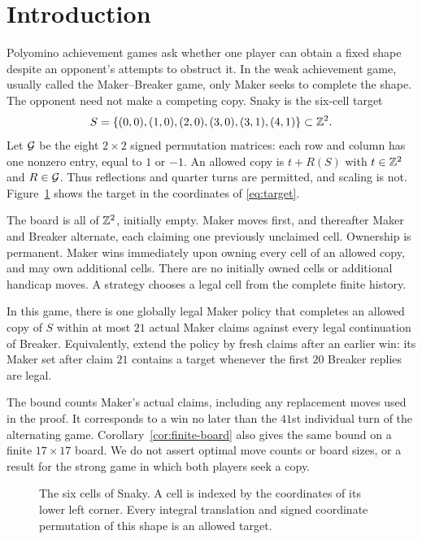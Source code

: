 \section{Introduction}\label{sec:introduction}

Polyomino achievement games ask whether one player can obtain a fixed
shape despite an opponent's attempts to obstruct it. In the weak
achievement game, usually called the Maker--Breaker game, only Maker
seeks to complete the shape. The opponent need not make a competing
copy. Snaky is the six-cell target
\begin{equation}\label{eq:target}
 S=\{(0,0),(1,0),(2,0),(3,0),(3,1),(4,1)\}\subset\mathbb Z^2.
\end{equation}
Let $\mathcal G$ be the eight $2\times2$ signed permutation matrices: each row
and column has one nonzero entry, equal to $1$ or $-1$.
An allowed copy is $t+R(S)$ with $t\in\mathbb Z^2$ and $R\in\mathcal G$.
Thus reflections and quarter turns are permitted, and scaling is not.
Figure~\ref{fig:target} shows the target in the coordinates of
\eqref{eq:target}.

The board is all of $\mathbb Z^2$, initially empty. Maker moves first, and
thereafter Maker and Breaker alternate, each claiming one previously
unclaimed cell. Ownership is permanent. Maker wins immediately upon
owning every cell of an allowed copy, and may own additional cells.
There are no initially owned cells or additional handicap moves.
A strategy chooses a legal cell from the complete finite history.

\begin{theorem}\label{thm:main}
In this game, there is one globally legal Maker policy that completes
an allowed copy of $S$ within at most $21$ actual Maker claims against
every legal continuation of Breaker. Equivalently, extend the policy by
fresh claims after an earlier win: its Maker set after claim $21$
contains a target whenever the first $20$ Breaker replies are legal.
\end{theorem}

The bound counts Maker's actual claims, including any replacement
moves used in the proof. It corresponds to a win no later than the
$41$st individual turn of the alternating game. Corollary~\ref{cor:finite-board}
also gives the same bound on a finite $17\times17$ board. We do not
assert optimal move counts or board sizes, or a result for the strong
game in which both players seek a copy.

\begin{figure}[tb]
\centering
{}
\caption{The six cells of Snaky. A cell is indexed by the coordinates
of its lower left corner. Every integral translation and signed
coordinate permutation of this shape is an allowed target.}
\label{fig:target}
\end{figure}

